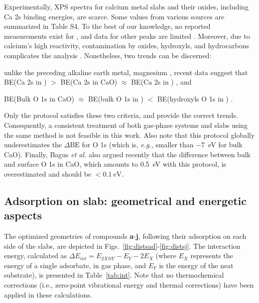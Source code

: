 \documentclass[%
aip,
amsmath,amssymb,
preprint,%
jcp,
showkeys,
]{revtex4-2}
\def\dbe{\ensuremath{\Delta\text{BE}}}
\begin{document}
Experimentally, XPS spectra for calcium metal slabs and their oxides, including Ca 2s binding energies, are scarce. Some values from various sources are summarized in Table S4. To the best of our knowledge, no reported measurements exist for , and data for other peaks are limited \cite{franzenXPSSpectraCrystalline1977,sveinbjornssonIonicConductivityFormation2014}. Moreover, due to calcium's high reactivity, contamination by oxides, hydroxyls, and hydrocarbons complicates the analysis \cite{dupinSystematicXPSStudies2000,bebenseeAdsorptionOxygenWater2008,fujimoriInteractionWaterCaO2016a,cristXPSLibraryWebsite2021a}. Nonetheless, two trends can be discerned: \begin{inparaenum}[(i)]
	\item unlike the preceding alkaline earth metal, magnesium \cite{dobrovolskyXPSStudyInfluence2017}, recent data suggest that BE(Ca 2s in ) $>$ BE(Ca 2s in CaO) $\approx$ BE(Ca 2s in ) \cite{ochsCO2ChemisorptionCa1998,cristHandbookMonochromaticXPS2000a,cristXPSLibraryWebsite2021a}, and 
	\item BE(Bulk O 1s in CaO) $\approx$ BE(bulk O 1s in ) $<$ BE(hydroxyls O 1s in ) \cite{dupinSystematicXPSStudies2000,bebenseeAdsorptionOxygenWater2008,fujimoriInteractionWaterCaO2016a,cristXPSLibraryWebsite2021a}.
\end{inparaenum}
Only the  protocol satisfies these two criteria, and provide the correct trends. Consequently, a consistent treatment of both gas-phase systems and slabs using the same method is not feasible in this work. Also note that this protocol globally underestimates the \dbe{} for O 1s (which is, \textit{e.g.}, smaller than \SI{-7}{\electronvolt} for bulk CaO\cite{cristXPSLibraryWebsite2021a}). Finally, Bagus \emph{et al.}\cite{bagusRevisitingSurfaceCorelevel2019} also argued recently that the difference between bulk and surface O 1s in CaO, which amounts to \SI{0.5}{\electronvolt} with this protocol, is overestimated  and should be $<\SI{0.1}{\electronvolt}$.



\clearpage

\subsection{Adsorption on slab: geometrical and energetic aspects}\label{sec:geom}

The optimized geometries of compounds \textbf{a}-\textbf{j}, following their adsorption on each side of the slabs, are depicted in Figs.~\ref{fig:distsad}-\ref{fig:distsj}. The interaction energy, calculated as $\Delta E_{int} = E_{2X@Y} - E_Y - 2E_X$ (where $E_X$ represents the energy of a single adsorbate, in gas phase, and $E_Y$ is the energy of the neat substrate), is presented in Table~\ref{tab:int}. Note that no thermochemical corrections (i.e., zero-point vibrational energy and thermal corrections) have been applied in these calculations.
\end{document}
